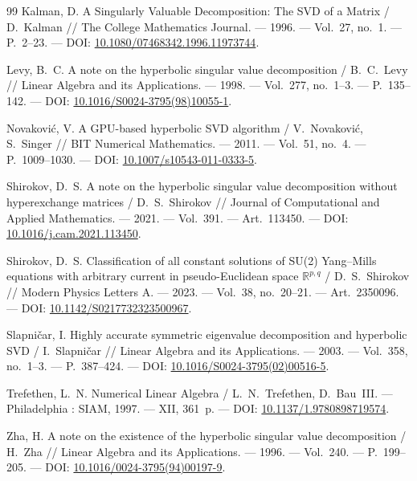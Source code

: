 \documentclass[a4paper,12pt]{article}
\theoremstyle{csstyle}
\begin{document}
\begin{thebibliography}{99}
Kalman, D.
A Singularly Valuable Decomposition: The SVD of a Matrix / D.~Kalman //
The College Mathematics Journal. --- 1996. --- Vol.~27, no.~1. ---
P.~2--23. ---
DOI: \href{https://doi.org/10.1080/07468342.1996.11973744}{10.1080/07468342.1996.11973744}.

Levy, B.~C.
A note on the hyperbolic singular value decomposition / B.~C.~Levy //
Linear Algebra and its Applications. --- 1998. ---
Vol.~277, no.~1--3. --- P.~135--142. ---
DOI: \href{https://doi.org/10.1016/S0024-3795(98)10055-1}{10.1016/S0024-3795(98)10055-1}.

Novakovi\'c, V.
A GPU-based hyperbolic SVD algorithm / V.~Novakovi\'c, S.~Singer //
BIT Numerical Mathematics. --- 2011. --- Vol.~51, no.~4. ---
P.~1009--1030. ---
DOI: \href{https://doi.org/10.1007/s10543-011-0333-5}{10.1007/s10543-011-0333-5}.

Shirokov, D.~S.
A note on the hyperbolic singular value decomposition without hyperexchange
matrices / D.~S.~Shirokov //
Journal of Computational and Applied Mathematics. --- 2021. ---
Vol.~391. --- Art.~113450. ---
DOI: \href{https://doi.org/10.1016/j.cam.2021.113450}{10.1016/j.cam.2021.113450}.

Shirokov, D.~S.
Classification of all constant solutions of SU(2) Yang--Mills equations with
arbitrary current in pseudo-Euclidean space $\mathbb R^{p,q}$ /
D.~S.~Shirokov //
Modern Physics Letters A. --- 2023. --- Vol.~38, no.~20--21. ---
Art.~2350096. ---
DOI: \href{https://doi.org/10.1142/S0217732323500967}{10.1142/S0217732323500967}.

Slapni\v{c}ar, I.
Highly accurate symmetric eigenvalue decomposition and hyperbolic SVD /
I.~Slapni\v{c}ar //
Linear Algebra and its Applications. --- 2003. ---
Vol.~358, no.~1--3. --- P.~387--424. ---
DOI: \href{https://doi.org/10.1016/S0024-3795(02)00516-5}{10.1016/S0024-3795(02)00516-5}.

Trefethen, L.~N.
Numerical Linear Algebra / L.~N.~Trefethen, D.~Bau~III. ---
Philadelphia : SIAM, 1997. --- XII, 361~p. ---
DOI: \href{https://doi.org/10.1137/1.9780898719574}{10.1137/1.9780898719574}.

Zha, H.
A note on the existence of the hyperbolic singular value decomposition /
H.~Zha //
Linear Algebra and its Applications. --- 1996. ---
Vol.~240. --- P.~199--205. ---
DOI: \href{https://doi.org/10.1016/0024-3795(94)00197-9}{10.1016/0024-3795(94)00197-9}.

\end{thebibliography}
\end{document}
